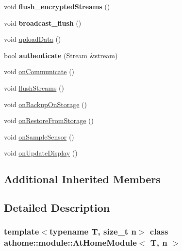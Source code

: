 \begin{DoxyCompactItemize}
\item 
\mbox{\label{classathome_1_1module_1_1_at_home_module_a97362ab78d9901dcad0e5cc5f623dc2c}} 
void {\bfseries flush\+\_\+encrypted\+Streams} ()
\item 
\mbox{\label{classathome_1_1module_1_1_at_home_module_a45a45c04235da53317d7bb47b0e989e4}} 
void {\bfseries broadcast\+\_\+flush} ()
\item 
void \mbox{\hyperlink{classathome_1_1module_1_1_at_home_module_a4fd5a07603ff4cb512d201352aa2be0a}{upload\+Data}} ()
\item 
\mbox{\label{classathome_1_1module_1_1_at_home_module_acebb5a1f098aa637fd9aaab20190c253}} 
bool {\bfseries authenticate} (Stream \&stream)
\item 
void \mbox{\hyperlink{classathome_1_1module_1_1_at_home_module_ad8da3ff2774cee42f1d45cd12912c937}{on\+Communicate}} ()
\item 
void \mbox{\hyperlink{classathome_1_1module_1_1_at_home_module_ad6e64ed8ff0c2daf0e8bb935b0a8e127}{flush\+Streams}} ()
\item 
void \mbox{\hyperlink{classathome_1_1module_1_1_at_home_module_aea6f4c8bdb27fa27915aa63185888f78}{on\+Backup\+On\+Storage}} ()
\item 
void \mbox{\hyperlink{classathome_1_1module_1_1_at_home_module_a7608679045f46ef0c07d7eab430d755b}{on\+Restore\+From\+Storage}} ()
\item 
void \mbox{\hyperlink{classathome_1_1module_1_1_at_home_module_a0c78d6ba7b9784d1a895bd9f109bd048}{on\+Sample\+Sensor}} ()
\item 
void \mbox{\hyperlink{classathome_1_1module_1_1_at_home_module_a78fdbc14589f82531bd08baeb2e3cfb1}{on\+Update\+Display}} ()
\end{DoxyCompactItemize}
\subsection*{Additional Inherited Members}


\subsection{Detailed Description}
\subsubsection*{template$<$typename T, size\+\_\+t n$>$\newline
class athome\+::module\+::\+At\+Home\+Module$<$ T, n $>$}

